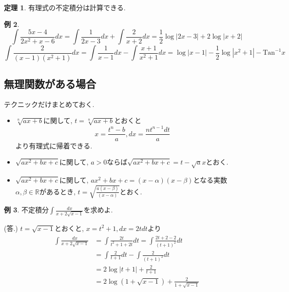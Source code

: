 \documentclass[dvipdfmx,a4paper,11pt]{article}
\newcommand{\R}{\mathbb{R}}
\newcommand{\Tan}{\text{Tan}^{-1}}
\theoremstyle{definition}
\newtheorem{thm}{定理}
\newtheorem{exa}[thm]{例}
\begin{document}
\begin{tcolorbox}[
    colback = white,
    colframe = green!35!black,
    fonttitle = \bfseries,
    breakable = true]
    \begin{thm}
有理式の不定積分は計算できる.
        \end{thm}
    \end{tcolorbox}
\begin{exa}
$$
\int \frac{5x -4 }{2x^2 + x -6}dx = \int \frac{1}{2x-3} dx+ \int \frac{2}{x+2}dx
= \frac{1}{2}\log|2x-3| + 2 \log |x+2|
$$
$$
\int \frac{2}{(x-1)(x^2 + 1)} dx = \int \frac{1}{x-1}dx  - \int \frac{x+1}{x^2 + 1}dx
= \log|x-1| - \frac{1}{2} \log |x^2+1|- \Tan x
$$
\end{exa}

\subsection{無理関数がある場合}
テクニックだけまとめておく.
\begin{itemize}
\item $\sqrt[n]{ax + b}$に関して, $t= \sqrt[n]{ax + b}$とおくと
$$
x = \frac{t^n - b}{a}, dx = \frac{n t^{n-1} dt}{a}
$$
より有理式に帰着できる.
\item $\sqrt{ax^2 + b x + c}$に関して, $a>0$ならば$\sqrt{ax^2 + b x + c} = t - \sqrt{a} x$とおく.
\item $\sqrt{ax^2 + b x + c}$に関して, $ax^2 + b x + c = (x - \alpha)(x- \beta)$となる実数$\alpha, \beta \in \R$があるとき, $t = \sqrt{\frac{a(x - \beta)}{(x-\alpha)}}$とおく.
\end{itemize}

\begin{exa}
不定積分$\int \frac{dx}{x + 2 \sqrt{x-1}}$を求めよ.

\hspace{-18pt}(答.) $t = \sqrt{x-1}$とおくと, $x = t^2 +1, dx = 2tdt$より
\begin{align*}
\begin{split}
\int \frac{dx}{x + 2 \sqrt{x-1}}
&= \int \frac{2t}{t^2 + 1 + 2t} dt= \int \frac{2t + 2 -2}{(t + 1)^2} dt \\
&=  \int \frac{2}{t + 1} dt -  \int \frac{2}{(t + 1)^2} dt \\
&= 2 \log |t+1| + \frac{2}{t+1} \\
&= 2 \log (1 + \sqrt{x-1}) + \frac{2}{1 + \sqrt{x-1}}
\end{split}
\end{align*}

\end{exa}
\end{document}
